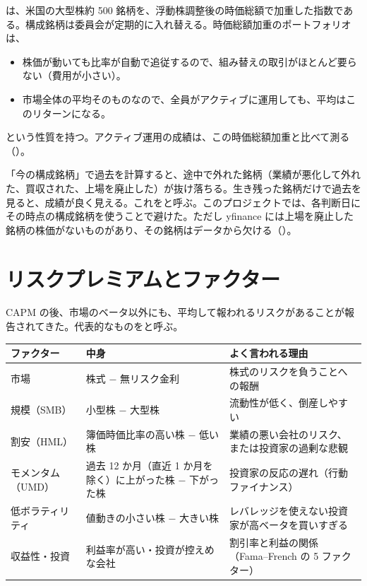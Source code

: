 \SP{} は、米国の大型株約 500 銘柄を、浮動株調整後の時価総額で加重した指数である。構成銘柄は委員会が定期的に入れ替える。時価総額加重のポートフォリオは、
\begin{itemize}
\item 株価が動いても比率が自動で追従するので、組み替えの取引がほとんど要らない（費用が小さい）。
\item 市場全体の平均そのものなので、全員がアクティブに運用しても、平均はこのリターンになる。
\end{itemize}
という性質を持つ。アクティブ運用の成績は、この時価総額加重と比べて測る（）。

\begin{notebox}[生存者バイアス]
「今の構成銘柄」で過去を計算すると、途中で外れた銘柄（業績が悪化して外れた、買収された、上場を廃止した）が抜け落ちる。生き残った銘柄だけで過去を見ると、成績が良く見える。これをと呼ぶ。このプロジェクトでは、各判断日にその時点の構成銘柄を使うことで避けた。ただし yfinance には上場を廃止した銘柄の株価がないものがあり、その銘柄はデータから欠ける（）。
\end{notebox}

\section{リスクプレミアムとファクター}

CAPM の後、市場のベータ以外にも、平均して報われるリスクがあることが報告されてきた。代表的なものをと呼ぶ。

\begin{longtable}{P{2.6cm}P{5.6cm}P{6.2cm}}
\toprule
\textbf{ファクター} & \textbf{中身} & \textbf{よく言われる理由} \\
\midrule
\endhead
\bottomrule
\endfoot
市場 & 株式 − 無リスク金利 & 株式のリスクを負うことへの報酬 \\
規模（SMB） & 小型株 − 大型株 & 流動性が低く、倒産しやすい \\
割安（HML） & 簿価時価比率の高い株 − 低い株 & 業績の悪い会社のリスク、または投資家の過剰な悲観 \\
モメンタム（UMD） & 過去 12 か月（直近 1 か月を除く）に上がった株 − 下がった株 & 投資家の反応の遅れ（行動ファイナンス） \\
低ボラティリティ & 値動きの小さい株 − 大きい株 & レバレッジを使えない投資家が高ベータを買いすぎる \\
収益性・投資 & 利益率が高い・投資が控えめな会社 & 割引率と利益の関係（Fama--French の 5 ファクター） \\
\end{longtable}

